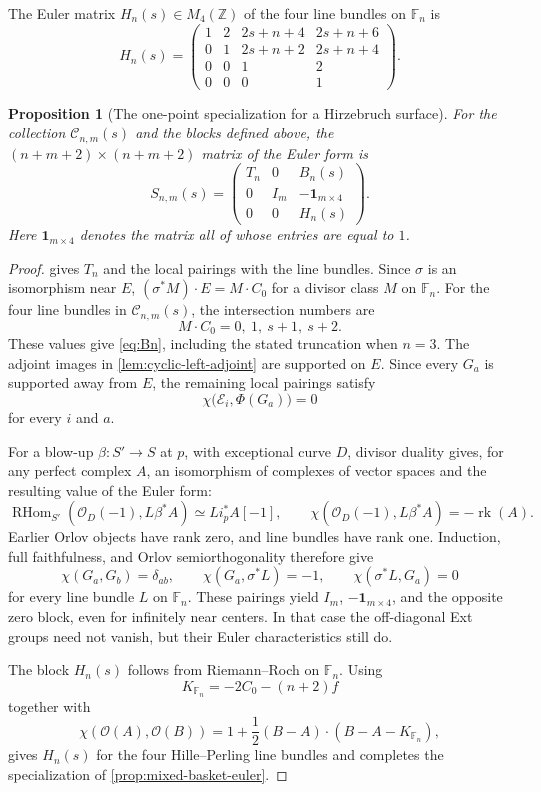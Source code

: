 \documentclass[11pt]{article}
\theoremstyle{plain}
\newtheorem{proposition}[proposition]{Proposition}
\theoremstyle{definition}
\theoremstyle{remark}
\newcommand{\F}{\mathbb F}
\newcommand{\Z}{\mathbb Z}
\newcommand{\rk}{\operatorname{rk}}
\newcommand{\RHom}{\operatorname{RHom}}
\newcommand{\OO}{\mathcal O}
\begin{document}
The Euler matrix \(H_n(s)\in M_4(\Z)\) of the four line bundles on \(\F_n\) is
\[
H_n(s)
=
\begin{pmatrix}
1&2&2s+n+4&2s+n+6\\
0&1&2s+n+2&2s+n+4\\
0&0&1&2\\
0&0&0&1
\end{pmatrix}.
\]

\begin{proposition}[The one-point specialization for a Hirzebruch surface]
\label{prop:general-one-point-euler}
For the collection \(\mathcal C_{n,m}(s)\) and the blocks defined above,
the \((n+m+2)\times(n+m+2)\)
matrix of the Euler form is
\[
\boxed{
S_{n,m}(s)
=
\begin{pmatrix}
T_n&0&B_n(s)\\
0&I_m&-\mathbf1_{m\times4}\\
0&0&H_n(s)
\end{pmatrix}
}.
\]
Here \(\mathbf1_{m\times4}\) denotes the matrix all of whose entries are
equal to \(1\).
\end{proposition}

\begin{proof}
 gives \(T_n\) and the local pairings
with the line bundles. Since \(\sigma\) is an isomorphism near \(E\),
\((\sigma^*M)\cdot E=M\cdot C_0\) for a divisor class \(M\) on
\(\F_n\). For the four line bundles in
\(\mathcal C_{n,m}(s)\), the intersection numbers are
\[
M\cdot C_0=0,\ 1,\ s+1,\ s+2.
\]
These values give \eqref{eq:Bn}, including the stated truncation when \(n=3\).
The adjoint images in \cref{lem:cyclic-left-adjoint} are supported on
\(E\). Since every \(G_a\) is supported away from \(E\), the remaining local pairings
satisfy
\[
\chi\bigl(\mathcal E_i,\Phi(G_a)\bigr)=0
\]
for every \(i\) and \(a\).

For a blow-up \(\beta:S'\to S\) at \(p\), with exceptional
curve \(D\), divisor duality gives, for any perfect complex \(A\),
an isomorphism of complexes of vector spaces and the resulting value of
the Euler form:
\[
\RHom_{S'}(\OO_D(-1),L\beta^*A)
\simeq Li_p^*A[-1],
\qquad
\chi(\OO_D(-1),L\beta^*A)=-\rk(A).
\]
Earlier Orlov objects have rank zero, and line bundles have rank one.
Induction, full faithfulness, and Orlov semiorthogonality
\cite[Theorem~4.3 and Corollary~4.4]{Orlov1993} therefore give
\[
\chi(G_a,G_b)=\delta_{ab},
\qquad
\chi(G_a,\sigma^*L)=-1,
\qquad
\chi(\sigma^*L,G_a)=0
\]
for every line bundle \(L\) on \(\F_n\). These pairings yield \(I_m\),
\(-\mathbf1_{m\times4}\), and the opposite zero block, even for
infinitely near centers. In that case the off-diagonal Ext groups
need not vanish, but their Euler characteristics still do.

The block \(H_n(s)\) follows from Riemann--Roch on \(\F_n\). Using
\[
K_{\F_n}=-2C_0-(n+2)f
\]
together with
\[
\chi(\OO(A),\OO(B))
=
1+\frac12(B-A)\cdot(B-A-K_{\F_n}),
\]
gives \(H_n(s)\) for the four Hille--Perling line bundles and
completes the specialization of \cref{prop:mixed-basket-euler}.
\end{proof}
\end{document}

